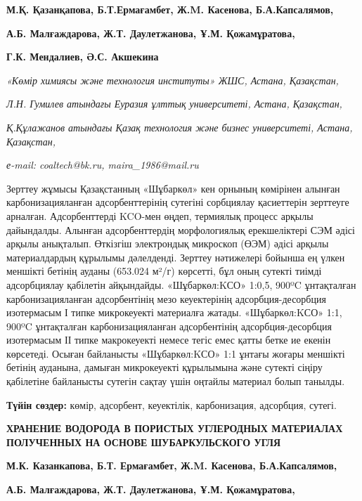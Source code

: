 {\bfseries {}М.Қ. Қазанқапова\envelope ,
Б.Т.Ермағамбет, Ж.M.
Касенова, Б.А.Капсалямов,}

{\bfseries {}А.Б. Малғаждарова,
Ж.Т. Даулетжанова, Ұ.М.
Қожамұратова,}

{\bfseries {}Г.К. Мендалиев, Ә.С.
Акшекина}

\emph{«Көмір химиясы және технология институты» ЖШС,
Астана, Қазақстан,}

\emph{Л.Н. Гумилев атындағы Еуразия ұлттық
университеті, Астана, Қазақстан,}

\emph{Қ.Құлажанов атындағы Қазақ технология және
бизнес университеті, Астана, Қазақстан,}

\emph{е-mail: coaltech@bk.ru,
maira\_1986@mail.ru}

Зерттеу жұмысы Қазақстанның «Шұбаркөл» кен орнының көмірінен алынған
карбонизацияланған адсорбенттерінің сутегіні сорбциялау қасиеттерін
зерттеуге арналған. Адсорбенттерді
KCO-мен өңдеп, термиялық процесс
арқылы дайындалды. Алынған адсорбенттердің морфологиялық ерекшеліктері
СЭМ әдісі арқылы анықталып. Өткізгіш электрондық микроскоп (ӨЭМ) әдісі
арқылы материалдардың құрылымы дәлелденді. Зерттеу нәтижелері бойынша ең
үлкен меншікті бетінің ауданы (653.024 м²/г) көрсетті, бұл оның сутекті
тиімді адсорбциялау қабілетін айқындайды.
«Шұбаркөл:KСО» 1:0,5, 900ºC
ұнтақталған карбонизацияланған адсорбентінің мезо кеуектерінің
адсорбция-десорбция изотермасым І типке микрокеуекті материалға жатады.
«Шұбаркөл:KСО» 1:1, 900ºC ұнтақталған
карбонизацияланған адсорбентінің адсорбция-десорбция изотермасым ІІ
типке макрокеуекті немесе тегіс емес қатты бетке ие екенін көрсетеді.
Осыған байланысты «Шұбаркөл:KСО» 1:1
ұнтағы жоғары меншікті бетінің ауданына, дамыған микрокеуекті құрылымына
және сутекті сіңіру қабілетіне байланысты сутегін сақтау үшін оңтайлы
материал болып танылды.

{\bfseries Түйін сөздер:} көмір, адсорбент, кеуектілік, карбонизация,
адсорбция, сутегі.

{\bfseries ХРАНЕНИЕ ВОДОРОДА В ПОРИСТЫХ УГЛЕРОДНЫХ МАТЕРИАЛАХ ПОЛУЧЕННЫХ НА
ОСНОВЕ ШУБАРКУЛЬСКОГО УГЛЯ}

{\bfseries {}М.К. Казанкапова,
Б.Т. Ермағамбет, Ж.M.
Касенова, Б.А.Капсалямов,}

{\bfseries {}А.Б. Малғаждарова,
Ж.Т. Даулетжанова, Ұ.М.
Қожамұратова,}

